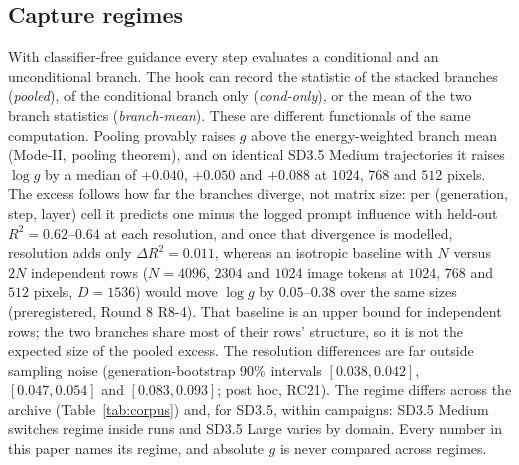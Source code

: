\documentclass[11pt]{article}
\begin{document}
\subsection{Capture regimes}
With classifier-free guidance \citep{ho2022classifierfree} every step evaluates a conditional and an unconditional branch. The hook can record the statistic of the stacked branches (\emph{pooled}), of the conditional branch only (\emph{cond-only}), or the mean of the two branch statistics (\emph{branch-mean}). These are different functionals of the same computation. Pooling provably raises $g$ above the energy-weighted branch mean (Mode-II, pooling theorem), and on identical SD3.5 Medium trajectories it raises $\log g$ by a median of $+0.040$, $+0.050$ and $+0.088$ at $1024$, $768$ and $512$ pixels. The excess follows how far the branches diverge, not matrix size: per (generation, step, layer) cell it predicts one minus the logged prompt influence with held-out $R^2=0.62$--$0.64$ at each resolution, and once that divergence is modelled, resolution adds only $\Delta R^2=0.011$, whereas an isotropic baseline with $N$ versus $2N$ independent rows ($N=4096$, $2304$ and $1024$ image tokens at $1024$, $768$ and $512$ pixels, $D=1536$) would move $\log g$ by $0.05$--$0.38$ over the same sizes (preregistered, Round 8 R8-4). That baseline is an upper bound for independent rows; the two branches share most of their rows' structure, so it is not the expected size of the pooled excess. The resolution differences are far outside sampling noise (generation-bootstrap 90\% intervals $[0.038,0.042]$, $[0.047,0.054]$ and $[0.083,0.093]$; post hoc, RC21). The regime differs across the archive (Table~\ref{tab:corpus}) and, for SD3.5, within campaigns: SD3.5 Medium switches regime inside runs and SD3.5 Large varies by domain. Every number in this paper names its regime, and absolute $g$ is never compared across regimes.
\end{document}
